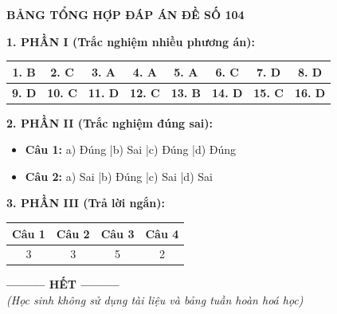\documentclass[12pt,a4paper]{article}
\begin{document}
\bigskip
\noindent
{\color{hfRed}\textbf{\large BẢNG TỔNG HỢP ĐÁP ÁN ĐỀ SỐ 104}}

\smallskip
\noindent
\textbf{1. PHẦN I (Trắc nghiệm nhiều phương án):}
\begin{center}
\begin{tabular}{|c|c|c|c|c|c|c|c|}
\hline
\textbf{1. B} & \textbf{2. C} & \textbf{3. A} & \textbf{4. A} & \textbf{5. A} & \textbf{6. C} & \textbf{7. D} & \textbf{8. D} \\ \hline
\textbf{9. D} & \textbf{10. C} & \textbf{11. D} & \textbf{12. C} & \textbf{13. B} & \textbf{14. D} & \textbf{15. C} & \textbf{16. D} \\ \hline
\end{tabular}
\end{center}

\noindent
\textbf{2. PHẦN II (Trắc nghiệm đúng sai):}
\begin{itemize}
	\item \textbf{Câu 1:} a) Đúng \quad|\quad b) Sai \quad|\quad c) Đúng \quad|\quad d) Đúng
	\item \textbf{Câu 2:} a) Sai \quad|\quad b) Đúng \quad|\quad c) Sai \quad|\quad d) Sai
\end{itemize}

\noindent
\textbf{3. PHẦN III (Trả lời ngắn):}
\begin{center}
\begin{tabular}{|c|c|c|c|}
\hline
\textbf{Câu 1} & \textbf{Câu 2} & \textbf{Câu 3} & \textbf{Câu 4} \\ \hline
3 & 3 & 5 & 2 \\ \hline
\end{tabular}
\end{center}

\begin{center}
\textbf{--------- HẾT ---------}\\
\textit{(Học sinh không sử dụng tài liệu và bảng tuần hoàn hoá học)}
\end{center}
\end{document}

